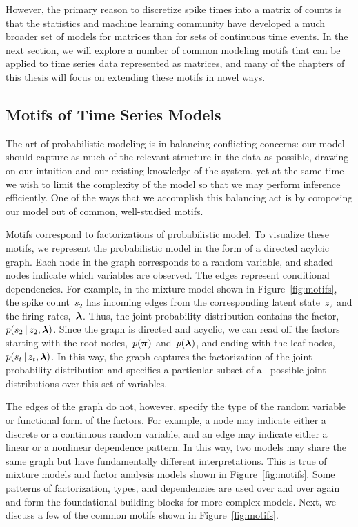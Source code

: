 However, the primary reason to discretize spike times into a matrix of
counts is that the statistics and machine learning community have
developed a much broader set of models for matrices than for sets of
continuous time events.  In the next section, we will explore a number
of common modeling motifs that can be applied to time series data
represented as matrices, and many of the chapters of this thesis will
focus on extending these motifs in novel ways.


\subsection{Motifs of Time Series Models}
\label{sec:motifs}
The art of probabilistic modeling is in balancing conflicting concerns:
our model should capture as much of the relevant structure in the data 
as possible, drawing on our intuition and our existing knowledge of the 
system, yet at the same time we wish to limit the complexity of the model
so that we may perform inference efficiently. One of the ways that we 
accomplish this balancing act is by composing our model out of common,
well-studied motifs. 

Motifs correspond to factorizations of probabilistic model.  To
visualize these motifs, we represent the probabilistic model in the
form of a directed acylcic graph. Each node in the graph corresponds
to a random variable, and shaded nodes indicate which variables are
observed. The edges represent conditional dependencies. For example,
in the mixture model shown in Figure~\ref{fig:motifs}, the spike
count~$s_2$ has incoming edges from the corresponding latent
state~$z_2$ and the firing rates,~$\boldsymbol{\lambda}$.  Thus, the joint
probability distribution contains the factor,~$p(s_2 \,|\, z_2,
\boldsymbol{\lambda})$. Since the graph is directed and acyclic, we can read off
the factors starting with the root nodes,~$p(\boldsymbol{\pi})$ and~$p(\boldsymbol{\lambda})$,
and ending with the leaf nodes, ~$p(s_t \,|\, z_t, \boldsymbol{\lambda})$. In
this way, the graph captures the factorization of the joint
probability distribution and specifies a particular subset of all
possible joint distributions over this set of variables.

The edges of the graph do not, however, specify the type of the random
variable or functional form of the factors. For example, a node may
indicate either a discrete or a continuous random variable, and an
edge may indicate either a linear or a nonlinear dependence
pattern. In this way, two models may share the same graph but have
fundamentally different interpretations. This is true of mixture
models and factor analysis models shown in Figure~\ref{fig:motifs}.
Some patterns of factorization, types, and dependencies are used
over and over again and form the foundational
building blocks for more complex models.
Next, we discuss a few of the common motifs shown in Figure~\ref{fig:motifs}.

